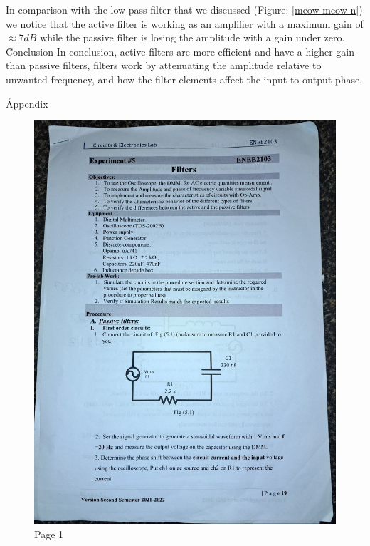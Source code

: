 \documentclass[12pt]{article}
\begin{document}
In comparison with the low-pass filter that we discussed (Figure: \ref{meow-meow-n}) we notice that the active filter is working as an amplifier with a maximum gain of $\approx 7dB$ while the passive filter is losing the amplitude with a gain under zero.
\clearpage
\h{Conclusion}
In conclusion, active filters are more efficient and have a higher gain than passive filters, filters work by attenuating the amplitude relative to unwanted frequency, and how the filter elements affect the input-to-output phase.
\clearpage


\h*{Appendix}

\begin{figure}[H]
    \centering
    \includegraphics[width=\textwidth]{assets/i1.jpg}
    \caption{Page 1}
\end{figure}
\end{document}
